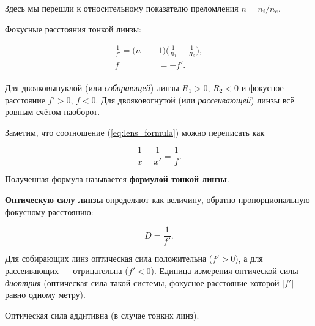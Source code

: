 Здесь мы перешли к относительному показателю преломления $n = n_{i}/n_{e}$.

Фокусные расстояния тонкой линзы:

\begin{align*}
\frac{1}{f'} = (n - &1) \Big(\frac{1}{R_{1}} - \frac{1}{R_{2}}\Big), \\ 
f &= -f'. \\
\end{align*} 

Для двояковыпуклой (или \textit{собирающей}) линзы $R_{1}>0$, $R_{2}<0$ и фокусное расстояние $f' > 0$, $f < 0$. Для двояковогнутой (или \textit{рассеивающей}) линзы всё ровным счётом наоборот.

Заметим, что соотношение (\ref{eq:lens_formula}) можно переписать как 

\begin{equation}
\frac{1}{x} - \frac{1}{x'} = \frac{1}{f}.
\label{eq:another_lens_formula}
\end{equation}

Полученная формула называется \textbf{формулой тонкой линзы}.

\textbf{Оптическую силу линзы} определяют как величину, обратно пропорциональную фокусному расстоянию:

\begin{equation}
D = \frac{1}{f'}.
\label{eq:optical_power}
\end{equation}

Для собирающих линз оптическая сила положительна ($f' > 0$), а для рассеивающих — отрицательна ($f' < 0$). Единица измерения оптической силы — \textit{диоптрия} (оптическая сила такой системы, фокусное расстояние которой $|f'|$ равно одному метру).

Оптическая сила аддитивна (в случае тонких линз).

